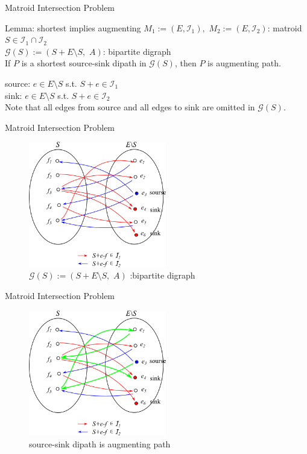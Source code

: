 \documentclass[11pt,xcolor=dvipsnames,table,dvipdfmx]{beamer}
\begin{document}
\begin{frame}{Matroid Intersection Problem}
 \begin{block}{Lemma: shortest implies augmenting}
  $M_1 := (E, \mathcal{I}_1),\,\, M_2 := (E, \mathcal{I}_2)$: matroid\\
  $S \in \mathcal{I}_1 \cap \mathcal{I}_2$\\
  $\mathcal{G}(S) := (S+E\setminus S,\,\,A)$:\,\,bipartite digraph\\
  If $P$ is a shortest source-sink dipath in $\mathcal{G}(S)$, then $P$ is augmenting path.
 \end{block}
 source: $e \in E \setminus S$ s.t. $S + e \in \mathcal{I}_1$\\
 sink: $e \in E \setminus S$ s.t. $S + e \in \mathcal{I}_2$\\
 Note that all edges from source and all edges to sink are omitted in $\mathcal{G}(S)$.
\end{frame}

\begin{frame}{Matroid Intersection Problem}
 \begin{figure}
  \caption{$\mathcal{G}(S) := (S+E \setminus S,\,\, A)$ :bipartite digraph}
  \centering
  \includegraphics[width=6cm]{matching.png}\vspace{0.5cm}
 \end{figure}
\end{frame}

\begin{frame}{Matroid Intersection Problem}
 \begin{figure}
  \caption{source-sink dipath is augmenting path}
  \centering
  \includegraphics[width=6cm]{matching2.png}\vspace{0.5cm}
 \end{figure}
\end{frame}
\end{document}
